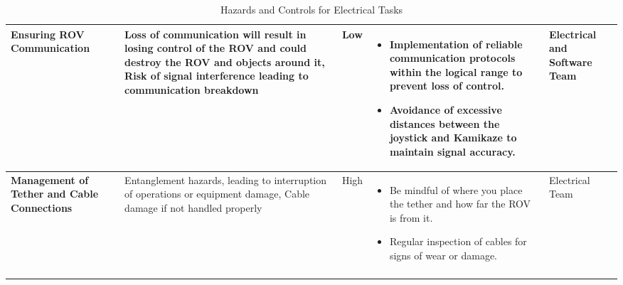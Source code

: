\documentclass[conference , 12pt]{IEEEtran}
\begin{document}
\begin{longtable}{|p{3.5cm}|>{\raggedright}p{3.5cm}|p{1.5cm}|>{\raggedright}p{5cm}|p{3cm}|}
    \hline
    \textbf{Ensuring ROV Communication}                                                                                                                                            &
    Loss of communication will result in losing control of the ROV and could destroy the ROV and objects around it, Risk of signal interference leading to communication breakdown &
    Low                                                                                                                                                                            &
    \begin{itemize}[leftmargin=*]
        \item Implementation of reliable communication protocols within the logical range to
              prevent loss of control.
        \item Avoidance of excessive distances between the joystick and Kamikaze to maintain
              signal accuracy.
    \end{itemize}                                                                                           &
    Electrical and Software Team                                                                                                                                                                                                                                                          \\

    \hline
    \textbf{Management of Tether and Cable Connections}                                                                                                                            &
    Entanglement hazards, leading to interruption of operations or equipment damage, Cable damage if not handled properly                                                          &
    High                                                                                                                                                                           &
    \begin{itemize}[leftmargin=*]
        \item Be mindful of where you place the tether and how far the ROV is from it.
        \item Regular inspection of cables for signs of wear or damage.
    \end{itemize}                                                                                                 &
    Electrical Team                                                                                                                                                                                                                                                                       \\
    \hline
    \caption{Hazards and Controls for Electrical Tasks}

\end{longtable}
\end{document}
